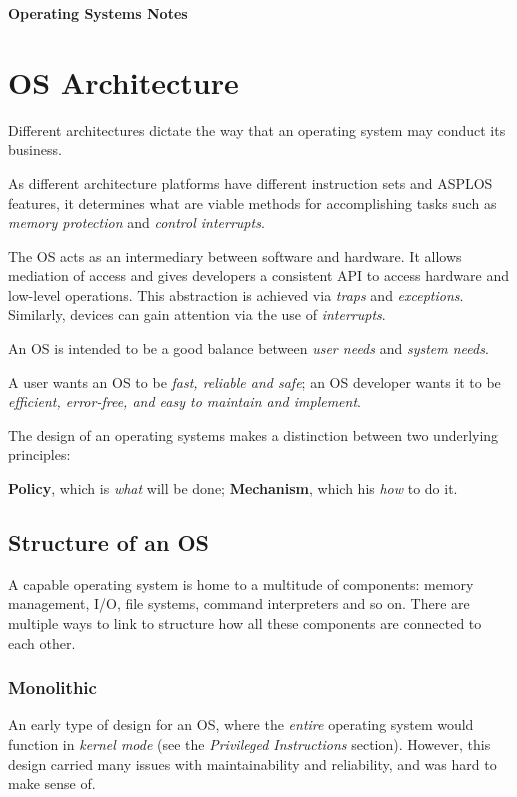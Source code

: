 \documentclass[a4]{article}
\begin{document}
\textbf{\Huge Operating Systems Notes}

\tableofcontents

\section{OS Architecture}

Different architectures dictate the way that an operating system may conduct its business.

As different architecture platforms have different instruction sets and ASPLOS features, it determines what are viable methods for accomplishing tasks such as \textit{memory protection} and \textit{control interrupts}.

The OS acts as an intermediary between software and hardware. It allows mediation of access and gives developers a consistent API to access hardware and low-level operations. This abstraction is achieved via \textit{traps} and \textit{exceptions}. Similarly, devices can gain attention via the use of \textit{interrupts}.

An OS is intended to be a good balance between \textit{user needs} and \textit{system needs}.

A user wants an OS to be \textit{fast, reliable and safe}; an OS developer wants it to be \textit{efficient, error-free, and easy to maintain and implement}.

The design of an operating systems makes a distinction between two underlying principles:

\textbf{Policy}, which is \textit{what} will be done; \textbf{Mechanism}, which his \textit{how} to do it.

\subsection{Structure of an OS}

A capable operating system is home to a multitude of components: memory management, I/O, file systems, command interpreters and so on. There are multiple ways to link to structure how all these components are connected to each other.

\subsubsection{Monolithic}

An early type of design for an OS, where the \textit{entire} operating system would function in \textit{kernel mode} (see the \textit{Privileged Instructions} section). However, this design carried many issues with maintainability and reliability, and was hard to make sense of.
\end{document}

